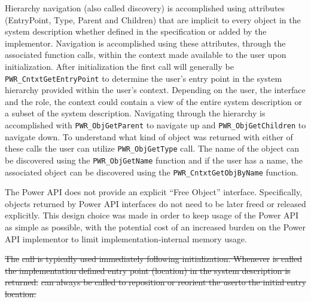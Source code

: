 \documentclass[12pt]{report} %
\providecommand{\DIFdeltex}[1]{{\protect\color{red}\sout{#1}}}                      %
\providecommand{\DIFdelbegin}{} %
\providecommand{\DIFdel}[1]{\texorpdfstring{\DIFdeltex{#1}}{}} %
\newcommand{\DIFscaledelfig}{0.5}
\newlength{\DIFdelgraphicswidth} %
\newlength{\DIFdelgraphicsheight} %
\newcommand{\DIFdelincludegraphics}[2][]{%
\sbox{\DIFdelgraphicsbox}{\DIFOincludegraphics[#1]{#2}}%
\settoboxwidth{\DIFdelgraphicswidth}{\DIFdelgraphicsbox} %
\settoboxtotalheight{\DIFdelgraphicsheight}{\DIFdelgraphicsbox} %
\scalebox{\DIFscaledelfig}{%
\parbox[b]{\DIFdelgraphicswidth}{\usebox{\DIFdelgraphicsbox}\\[-\baselineskip] \rule{\DIFdelgraphicswidth}{0em}}\llap{\resizebox{\DIFdelgraphicswidth}{\DIFdelgraphicsheight}{%
\setlength{\unitlength}{\DIFdelgraphicswidth}%
\begin{picture}(1,1)%
\thicklines\linethickness{2pt} %
{\color[rgb]{1,0,0}\put(0,0){\framebox(1,1){}}}%
{\color[rgb]{1,0,0}\put(0,0){\line( 1,1){1}}}%
{\color[rgb]{1,0,0}\put(0,1){\line(1,-1){1}}}%
\end{picture}%
}\hspace*{3pt}}} %
} %
\DeclareRobustCommand{\DIFdelbegin}{\DIFOdelbegin \let\includegraphics\DIFdelincludegraphics} %
\begin{document}
Hierarchy navigation (also called discovery) is accomplished using attributes (EntryPoint, Type, Parent and Children) that are implicit to every object in the system description whether defined in the specification or added by the implementor.
Navigation is accomplished using these attributes, through the associated function calls, within the context made available to the user upon initialization.
After initialization the first call will generally be \texttt{PWR_CntxtGetEntryPoint} to determine the user's entry point in the system hierarchy provided within the user's context. 
Depending on the user, the interface and the role, the context could contain a view of the entire system description or a subset of the system description.
Navigating through the hierarchy is accomplished with \texttt{PWR_ObjGetParent} to navigate up and \texttt{PWR_ObjGetChildren} to navigate down.
To understand what kind of object was returned with either of these calls the user can utilize \texttt{PWR_ObjGetType} call.
The name of the object can be discovered using the \texttt{PWR_ObjGetName} function and if the user has a name, the associated object can be discovered using the \texttt{PWR_CntxtGetObjByName} function. 

The Power API does not provide an explicit ``Free Object'' interface.
Specifically, objects returned by Power API interfaces do not need to be later freed or released explicitly.
This design choice was made in order to keep usage of the Power API as simple as possible, with the potential cost of an increased burden on the Power API implementor to limit implementation-internal memory usage.


\DIFdelbegin %

\DIFdel{The }%
\DIFdel{call is typically used immediately following initialization. 
Whenever }%
\DIFdel{is called the implementation defined entry point (location) in the system description is returned. 
}%
\DIFdel{can always be called to reposition or reorient the userto the initial entry location.
}%
\end{document}
